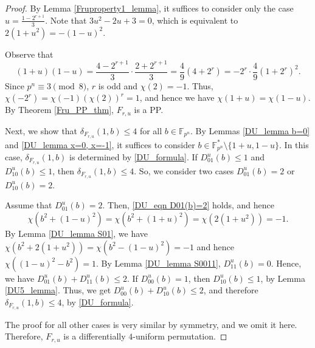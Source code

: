 \documentclass[11pt]{article}
\numberwithin{theorem}{section}
\newcommand{\Fpn}{\mathbb{F}_{p^n}}
\newcommand{\Fpnmul}{\mathbb{F}_{p^n}^*}
\begin{document}
\begin{proof}
	By Lemma \ref{Fruproperty1_lemma}, it suffices to consider only the case $u=\frac{1-2^{r+1}}{3}$. Note that $3u^2-2u+3=0$, which is equivalent to $2(1+u^2)=-(1-u)^2$.
	
	Observe that
	\begin{equation*}
		(1+u)(1-u) = \frac{4-2^{r+1}}{3}\cdot \frac{2+2^{r+1}}{3} =\frac{4}{9} (4+2^r)= -2^r \cdot \frac{4}{9}(1+2^r)^2.
	\end{equation*}
	Since $p^n \equiv 3\pmod{8}$, $r$ is odd and $\chi(2)=-1$. Thus, $\chi(-2^r) = \chi(-1)\left(\chi(2)\right)^r = 1$, and hence we have $\chi(1+u) = \chi(1-u)$. By Theorem \ref{Fru_PP_thm}, $F_{r,u}$ is a PP.	
	
	Next, we show that $\delta_{F_{r,u}}(1,b) \le 4$ for all $b\in \Fpn$. By Lemmas \ref{DU_lemma b=0} and \ref{DU_lemma x=0, x=-1}, it suffices to consider $b\in \Fpnmul \setminus \{1+u, 1-u\}$. In this case, $\delta_{F_{r,u}}(1,b)$ is determined by \eqref{DU_formula}. If $D_{01}^u (b) \le 1$ and $D_{10}^u (b) \le 1$, then $\delta_{F_{r,u}}(1,b)\le 4$. So, we consider two cases $D_{01}^u (b) = 2$ or $D_{10}^u (b) =2$.
	
	Assume that $D_{01}^u (b) = 2$. Then, \eqref{DU_eqn D01(b)=2} holds, and hence
	\begin{equation*}
		\chi(b^2+(1-u)^2)=\chi(b^2+(1+u)^2)=\chi(2(1+u^2))=-1.
	\end{equation*}
	By Lemma \ref{DU_lemma S01}, we have $\chi(b^2+2(1+u^2))=\chi(b^2-(1-u)^2)=-1$ and hence $\chi((1-u)^2-b^2)=1$. By Lemma \ref{DU_lemma S0011}, $D_{11}^u (b) =0$. Hence, we have $D_{01}^u (b) + D_{11}^u (b) \le 2$. If $D_{00}^u (b) = 1$, then $D_{10}^u (b) \le 1$, by Lemma \ref{DU5_lemma}. Thus, we get $D_{00}^u (b) + D_{10}^u (b) \le 2$, and therefore $\delta_{F_{r,u}}(1,b)\le 4$, by \eqref{DU_formula}.
	
	The proof for all other cases is very similar by symmetry, and we omit it here. Therefore, $F_{r,u}$ is a differentially $4$-uniform permutation.
\end{proof}
\end{document}
